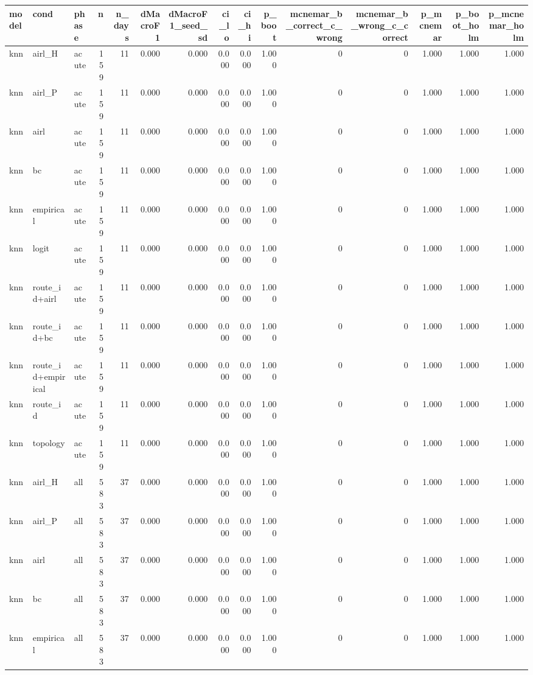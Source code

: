 \begin{tabular}{lllrrrrrrrrrrrr}
\toprule
model & cond & phase & n & n_days & dMacroF1 & dMacroF1_seed_sd & ci_lo & ci_hi & p_boot & mcnemar_b_correct_c_wrong & mcnemar_b_wrong_c_correct & p_mcnemar & p_boot_holm & p_mcnemar_holm \\
\midrule
knn & airl_H & acute & 159 & 11 & 0.000 & 0.000 & 0.000 & 0.000 & 1.000 & 0 & 0 & 1.000 & 1.000 & 1.000 \\
knn & airl_P & acute & 159 & 11 & 0.000 & 0.000 & 0.000 & 0.000 & 1.000 & 0 & 0 & 1.000 & 1.000 & 1.000 \\
knn & airl & acute & 159 & 11 & 0.000 & 0.000 & 0.000 & 0.000 & 1.000 & 0 & 0 & 1.000 & 1.000 & 1.000 \\
knn & bc & acute & 159 & 11 & 0.000 & 0.000 & 0.000 & 0.000 & 1.000 & 0 & 0 & 1.000 & 1.000 & 1.000 \\
knn & empirical & acute & 159 & 11 & 0.000 & 0.000 & 0.000 & 0.000 & 1.000 & 0 & 0 & 1.000 & 1.000 & 1.000 \\
knn & logit & acute & 159 & 11 & 0.000 & 0.000 & 0.000 & 0.000 & 1.000 & 0 & 0 & 1.000 & 1.000 & 1.000 \\
knn & route_id+airl & acute & 159 & 11 & 0.000 & 0.000 & 0.000 & 0.000 & 1.000 & 0 & 0 & 1.000 & 1.000 & 1.000 \\
knn & route_id+bc & acute & 159 & 11 & 0.000 & 0.000 & 0.000 & 0.000 & 1.000 & 0 & 0 & 1.000 & 1.000 & 1.000 \\
knn & route_id+empirical & acute & 159 & 11 & 0.000 & 0.000 & 0.000 & 0.000 & 1.000 & 0 & 0 & 1.000 & 1.000 & 1.000 \\
knn & route_id & acute & 159 & 11 & 0.000 & 0.000 & 0.000 & 0.000 & 1.000 & 0 & 0 & 1.000 & 1.000 & 1.000 \\
knn & topology & acute & 159 & 11 & 0.000 & 0.000 & 0.000 & 0.000 & 1.000 & 0 & 0 & 1.000 & 1.000 & 1.000 \\
knn & airl_H & all & 583 & 37 & 0.000 & 0.000 & 0.000 & 0.000 & 1.000 & 0 & 0 & 1.000 & 1.000 & 1.000 \\
knn & airl_P & all & 583 & 37 & 0.000 & 0.000 & 0.000 & 0.000 & 1.000 & 0 & 0 & 1.000 & 1.000 & 1.000 \\
knn & airl & all & 583 & 37 & 0.000 & 0.000 & 0.000 & 0.000 & 1.000 & 0 & 0 & 1.000 & 1.000 & 1.000 \\
knn & bc & all & 583 & 37 & 0.000 & 0.000 & 0.000 & 0.000 & 1.000 & 0 & 0 & 1.000 & 1.000 & 1.000 \\
knn & empirical & all & 583 & 37 & 0.000 & 0.000 & 0.000 & 0.000 & 1.000 & 0 & 0 & 1.000 & 1.000 & 1.000 \\

\end{tabular}
